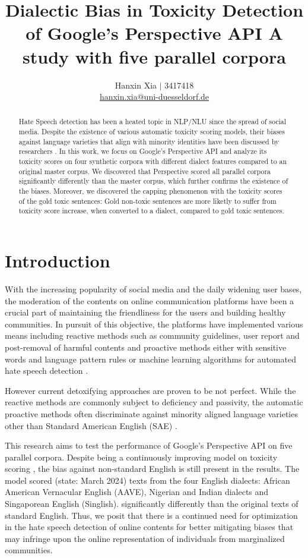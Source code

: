 \documentclass[11pt]{article}
\title{Dialectic Bias in Toxicity Detection of Google's Perspective API
\bigbreak A study with five parallel corpora}
\author{Hanxin Xia $\vert$ 3417418\\
  \href{mailto://hanxin.xia@uni-duesseldorf.de}{hanxin.xia@uni-duesseldorf.de}}
\begin{document}
\maketitle

\begin{abstract}
Hate Speech detection has been a heated topic in NLP/NLU since the spread of social media. Despite the existence of various automatic toxicity scoring models, their biases against language varieties that align with minority identities have been discussed by researchers \citep{sap-etal-2019-risk}. In this work, we focus on Google's Perspective API and analyze its toxicity scores on four synthetic corpora with different dialect features compared to an original master corpus. We discovered that Perspective scored all parallel corpora significantly differently than the master corpus, which further confirms the existence of the biases. Moreover, we discovered the capping phenomenon with the toxicity scores of the gold toxic sentences: Gold non-toxic sentences are more liketly to suffer from toxicity score increase, when converted to a dialect, compared to gold toxic sentences.
\end{abstract}


\section{Introduction}

With the increasing popularity of social media and the daily widening user bases, the moderation of the contents on online communication platforms have been a crucial part of maintaining the friendliness for the users and building healthy communities. In pursuit of this objective, the platforms have implemented various means including reactive methods such as community guidelines, user report and post-removal of harmful contents and proactive methods either with sensitive words and language pattern rules \citep{gitari-2015-lexicon} or machine learning algorithms for automated hate speech detection \citep{alrehili-2019-survey}.

However current detoxifying approaches are proven to be not perfect. While the reactive methods are commonly subject to deficiency and passivity, the automatic proactive methods often discriminate against minority aligned language varieties other than Standard American English (SAE) \citep{sap-etal-2019-risk, zhou-etal-2021-challenges}.

This research aims to test the performance of Google’s Perspective API on five parallel corpora. Despite being a continuously improving model on toxicity scoring \citep{google-perspective}, the bias against non-standard English is still present in the results. The model scored (state: March 2024) texts from the four English dialects: African American Vernacular English (AAVE), Nigerian and Indian dialects and Singaporean English (Singlish). significantly differently than the original texts of standard English. Thus, we posit that there is a continued need for optimization in the hate speech detection of online contents for better mitigating biases that may infringe upon the online representation of individuals from marginalized communities.
\end{document}
